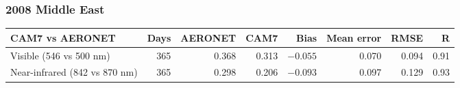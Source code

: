\begin{frame}[t]
\frametitle{2008 Middle East}
\centering
{}\hfill
{}\par
\vspace{0.15cm}
\hfill
{}\par
\vspace{0.1cm}
{\tiny\setlength{\tabcolsep}{5pt}
\begin{tabular}{@{}lrrrrrrr@{}}
\toprule
CAM7 vs AERONET & Days & AERONET & CAM7 & Bias & Mean error & RMSE & R \\
\midrule
Visible (546 vs 500 nm) & 365 & 0.368 & 0.313 & $-0.055$ & 0.070 & 0.094 & 0.91 \\
Near-infrared (842 vs 870 nm) & 365 & 0.298 & 0.206 & $-0.093$ & 0.097 & 0.129 & 0.93 \\
\bottomrule
\end{tabular}\par}
\end{frame}
